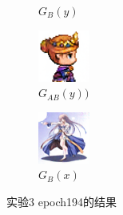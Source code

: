 \documentclass{beamer}
\begin{document}
\begin{frame}
\begin{figure}[htb]
\begin{subfigure}[b]{0.23\linewidth}
        \caption{$G_B(y)$}
      \end{subfigure}
      \begin{subfigure}[b]{0.23\linewidth}
        \includegraphics[width=\linewidth]{exp3_epoch194_rec_B.png}
        \caption{$G_{AB}(y))$}
      \end{subfigure}
      \begin{subfigure}[b]{0.23\linewidth}
        \includegraphics[width=\linewidth]{exp3_epoch194_idt_B.png}
        \caption{$G_B(x)$}
      \end{subfigure}
      \caption{实验3 epoch194的结果}
      \label{fig:exp3epoch194}
\end{figure}

\end{frame}
\end{document}
